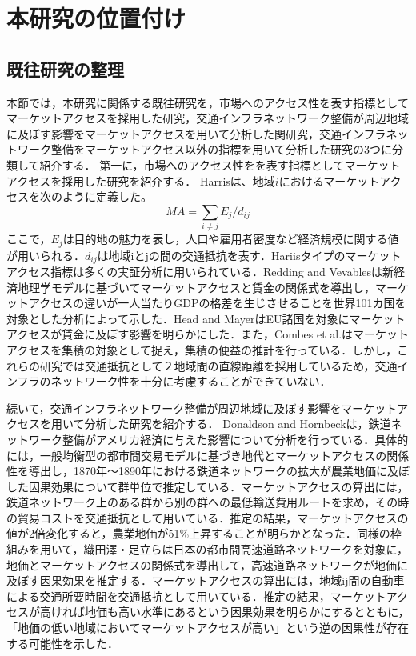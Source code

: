 \chapter{本研究の位置付け}

\section{既往研究の整理}
本節では，本研究に関係する既往研究を，市場へのアクセス性を表す指標としてマーケットアクセスを採用した研究，交通インフラネットワーク整備が周辺地域に及ぼす影響をマーケットアクセスを用いて分析した関研究，交通インフラネットワーク整備をマーケットアクセス以外の指標を用いて分析した研究の3つに分類して紹介する．
第一に，市場へのアクセス性をを表す指標としてマーケットアクセスを採用した研究を紹介する．
Harris\cite{harrisc1954}は、地域$i$におけるマーケットアクセスを次のように定義した。
\[ MA = \sum_{i \neq j}{E_{j}/d_{ij}}\]
ここで，$E_{j}$は目的地の魅力を表し，人口や雇用者密度など経済規模に関する値が用いられる．$d_{ij}$は地域iとjの間の交通抵抗を表す．Hariisタイプのマーケットアクセス指標は多くの実証分析に用いられている．Redding and Vevables\cite{redding2004}は新経済地理学モデルに基づいてマーケットアクセスと賃金の関係式を導出し，マーケットアクセスの違いが一人当たりGDPの格差を生じさせることを世界101カ国を対象とした分析によって示した．Head and Mayer\cite{head2006}はEU諸国を対象にマーケットアクセスが賃金に及ぼす影響を明らかにした．また，Combes et al.\cite{combes2010}はマーケットアクセスを集積の対象として捉え，集積の便益の推計を行っている．しかし，これらの研究では交通抵抗として２地域間の直線距離を採用しているため，交通インフラのネットワーク性を十分に考慮することができていない．
 
続いて，交通インフラネットワーク整備が周辺地域に及ぼす影響をマーケットアクセスを用いて分析した研究を紹介する．
Donaldson and Hornbeck\cite{donaldson2016}は，鉄道ネットワーク整備がアメリカ経済に与えた影響について分析を行っている．具体的には，一般均衡型の都市間交易モデルに基づき地代とマーケットアクセスの関係性を導出し，1870年〜1890年における鉄道ネットワークの拡大が農業地価に及ぼした因果効果について群単位で推定している．マーケットアクセスの算出には，鉄道ネットワーク上のある群から別の群への最低輸送費用ルートを求め，その時の貿易コストを交通抵抗として用いている．推定の結果，マーケットアクセスの値が2倍変化すると，農業地価が51\%上昇することが明らかとなった．同様の枠組みを用いて，織田澤・足立ら\cite{otazawa2022}は日本の都市間高速道路ネットワークを対象に，地価とマーケットアクセスの関係式を導出して，高速道路ネットワークが地価に及ぼす因果効果を推定する．マーケットアクセスの算出には，地域ij間の自動車による交通所要時間を交通抵抗として用いている．推定の結果，マーケットアクセスが高ければ地価も高い水準にあるという因果効果を明らかにするとともに，「地価の低い地域においてマーケットアクセスが高い」という逆の因果性が存在する可能性を示した．

